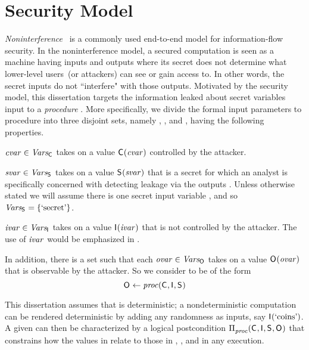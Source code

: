 \section{Security Model}
\label{sec:basic}
\textit{Noninterference}~\cite{goguen1982security} is
a commonly used end-to-end model for information-flow security. In the
noninterference model, a secured computation is seen as a machine
having inputs and outputs where its secret does not determine what
lower-level users~(or attackers) can see or gain access to. In other
words, the secret inputs do not ``interfere" with those outputs.
Motivated by the security model, this dissertation targets
the information leaked about secret variables input to a
\textit{procedure} \proc.  More specifically, we divide the formal
input parameters to procedure \proc into three disjoint sets, namely
\ACIKeys, \SecKeys, and \AIIKeys, having the following properties.
\begin{compactitem} 
\item $\mathit{cvar} \in \mathit{Vars_{\mathsf{C}_{}}}$ takes on a value $\mathsf{C}_{}(\mathit{cvar})$
  controlled by the attacker. 
\item $\mathit{svar} \in \mathit{Vars_{\mathsf{S}_{}}}$ takes on a value $\mathsf{S}_{}(\mathit{svar})$ that
  is a secret for which an analyst is specifically concerned with
  detecting leakage via the outputs \AOOKeys{}.  Unless otherwise stated
  we will assume there is one secret input variable \secretVar, and so
  $\mathit{Vars_{\mathsf{S}_{}}} = \{\textrm{`secret'}\}$.
\item $\mathit{ivar} \in \mathit{Vars_{\mathsf{I}_{}}}$ takes on a value $\mathsf{I}_{}(\mathit{ivar})$ that
  is not controlled by the attacker. The use of $\mathit{ivar}$
would be emphasized in .
\end{compactitem}
In addition, there is a set \AOOKeys such that each $\mathit{ovar} \in
\mathit{Vars_{\mathsf{O}_{}}}$ takes on a value $\mathsf{O}_{}(\mathit{ovar})$ that is observable by
the attacker.  So we consider \proc to be of the form
\[
\mathsf{O}_{} \gets \mathit{proc}(\mathsf{C}_{}, \mathsf{I}_{}, \mathsf{S}_{})
\]

This dissertation assumes that \proc is deterministic; a nondeterministic
computation \proc can be rendered deterministic by adding any
randomness as inputs, say $\mathsf{I}_{}(\textrm{`coins'})$. A given \proc can
then be characterized by a logical postcondition
$\Pi_{\mathit{proc}}^{}(\mathsf{C}_{}, \mathsf{I}_{}, \mathsf{S}_{}, \mathsf{O}_{})$
that constrains how the values in \AOOFn{} relate to those in
\ACIFn{}, \AIIFn{}, and \SecFn{} in any execution. 
\iffalse
Without loss of generality,
below we assume \SecKeys contains a single variable \SecVar, i.e.,
$\SecKeys = \{ \SecVar \}$.
\fi

